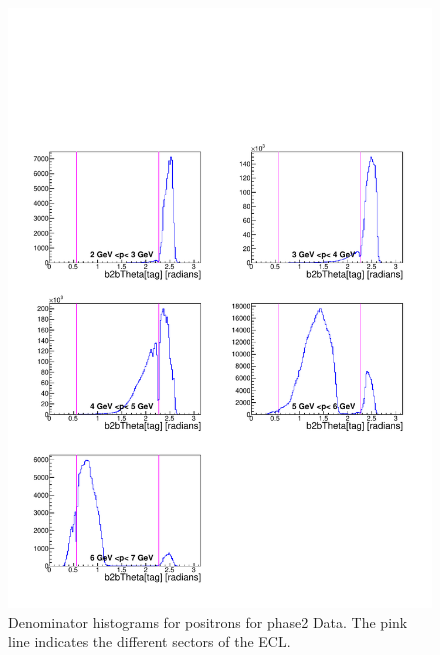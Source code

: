 \documentclass[a4paper,11pt,twosided,final,german,openbib,pdftex,listof=totoc,bibliography=totoc]{scrbook}
\begin{document}
\begin{appendix}
\begin{figure}[!htbp]
	\centering
	\includegraphics[width=\textwidth]{Plots/master/xPMThetaepD_Data}
	\caption[Momentum $\phi$ Positron Denominator Histogram Phase2 Data]{Denominator histograms for positrons for phase2 Data. The pink line indicates the different sectors of the ECL.}
	\label{plt:PMThetaepD_Data}
\end{figure}
\clearpage





\end{appendix}
\end{document}
